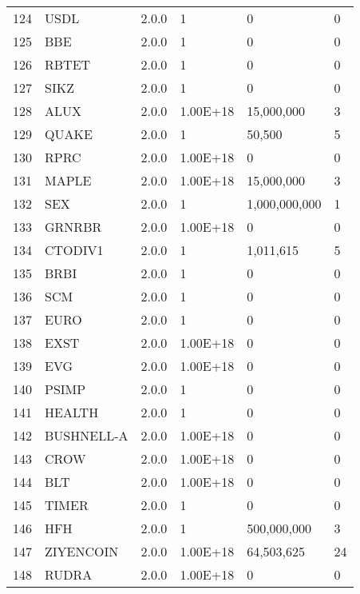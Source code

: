 \begin{longtable}{llllll}
124 & USDL & 2.0.0 & 1 & 0 & 0 \\
125 & BBE & 2.0.0 & 1 & 0 & 0 \\
126 & RBTET & 2.0.0 & 1 & 0 & 0 \\
127 & SIKZ & 2.0.0 & 1 & 0 & 0 \\
128 & ALUX & 2.0.0 & 1.00E+18 & 15,000,000 & 3 \\
129 & QUAKE & 2.0.0 & 1 & 50,500 & 5 \\
130 & RPRC & 2.0.0 & 1.00E+18 & 0 & 0 \\
131 & MAPLE & 2.0.0 & 1.00E+18 & 15,000,000 & 3 \\
132 & SEX & 2.0.0 & 1 & 1,000,000,000 & 1 \\
133 & GRNRBR & 2.0.0 & 1.00E+18 & 0 & 0 \\
134 & CTODIV1 & 2.0.0 & 1 & 1,011,615 & 5 \\
135 & BRBI & 2.0.0 & 1 & 0 & 0 \\
136 & SCM & 2.0.0 & 1 & 0 & 0 \\
137 & EURO & 2.0.0 & 1 & 0 & 0 \\
138 & EXST & 2.0.0 & 1.00E+18 & 0 & 0 \\
139 & EVG & 2.0.0 & 1.00E+18 & 0 & 0 \\
140 & PSIMP & 2.0.0 & 1 & 0 & 0 \\
141 & HEALTH & 2.0.0 & 1 & 0 & 0 \\
142 & BUSHNELL-A & 2.0.0 & 1.00E+18 & 0 & 0 \\
143 & CROW & 2.0.0 & 1.00E+18 & 0 & 0 \\
144 & BLT & 2.0.0 & 1.00E+18 & 0 & 0 \\
145 & TIMER & 2.0.0 & 1 & 0 & 0 \\
146 & HFH & 2.0.0 & 1 & 500,000,000 & 3 \\
147 & ZIYENCOIN & 2.0.0 & 1.00E+18 & 64,503,625 & 24 \\
148 & RUDRA & 2.0.0 & 1.00E+18 & 0 & 0 \\


\end{longtable}
